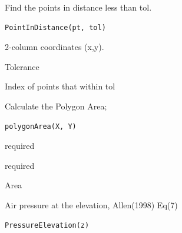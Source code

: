 \documentclass[a4paper]{book}
\begin{document}
%
\begin{Description}\relax
Find the points in distance less than tol.
\end{Description}
%
\begin{Usage}
\begin{verbatim}
PointInDistance(pt, tol)
\end{verbatim}
\end{Usage}
%
\begin{Arguments}
\begin{ldescription}
\item[\code{pt}] 2-column coordinates (x,y).

\item[\code{tol}] Tolerance
\end{ldescription}
\end{Arguments}
%
\begin{Value}
Index of points that within tol
\end{Value}
%
\begin{Description}\relax
Calculate the Polygon Area;
\end{Description}
%
\begin{Usage}
\begin{verbatim}
polygonArea(X, Y)
\end{verbatim}
\end{Usage}
%
\begin{Arguments}
\begin{ldescription}
\item[\code{X}] required

\item[\code{Y}] required
\end{ldescription}
\end{Arguments}
%
\begin{Value}
Area
\end{Value}
%
\begin{Description}\relax
Air pressure at the elevation, Allen(1998) Eq(7)
\end{Description}
%
\begin{Usage}
\begin{verbatim}
PressureElevation(z)
\end{verbatim}
\end{Usage}
\end{document}
